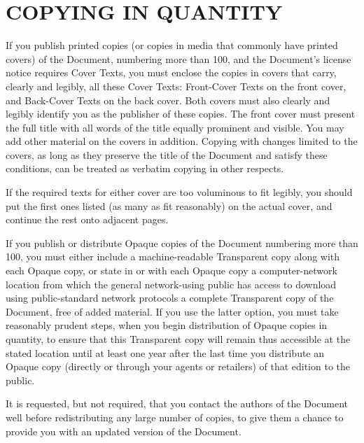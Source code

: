 \section{COPYING IN QUANTITY}
If you publish printed copies (or copies in media that commonly have printed covers) of the
Document, numbering more than 100, and the Document’s license notice requires Cover Texts,
you must enclose the copies in covers that carry, clearly and legibly, all these Cover Texts:
Front-Cover Texts on the front cover, and Back-Cover Texts on the back cover. Both covers
must also clearly and legibly identify you as the publisher of these copies. The front cover must
present the full title with all words of the title equally prominent and visible. You may add
other material on the covers in addition. Copying with changes limited to the covers, as long as
they preserve the title of the Document and satisfy these conditions, can be treated as verbatim
copying in other respects.

If the required texts for either cover are too voluminous to fit legibly, you should put the first
ones listed (as many as fit reasonably) on the actual cover, and continue the rest onto adjacent
pages.

If you publish or distribute Opaque copies of the Document numbering more than 100, you
must either include a machine-readable Transparent copy along with each Opaque copy, or state
in or with each Opaque copy a computer-network location from which the general network-using
public has access to download using public-standard network protocols a complete Transparent
copy of the Document, free of added material. If you use the latter option, you must take
reasonably prudent steps, when you begin distribution of Opaque copies in quantity, to ensure
that this Transparent copy will remain thus accessible at the stated location until at least one
year after the last time you distribute an Opaque copy (directly or through your agents or
retailers) of that edition to the public.

It is requested, but not required, that you contact the authors of the Document well before
redistributing any large number of copies, to give them a chance to provide you with an updated
version of the Document.



